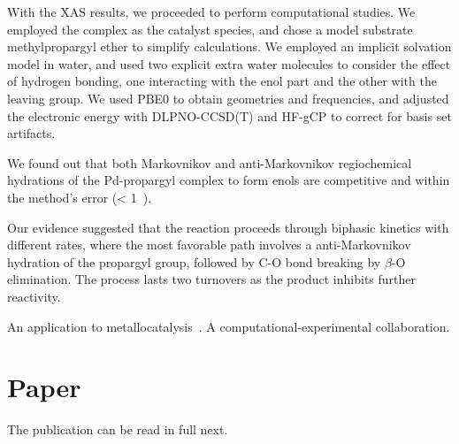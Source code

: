 With the XAS results, we proceeded to perform computational studies.
We employed the  complex as the catalyst species, and chose a
model substrate methylpropargyl ether to simplify calculations.
We employed an implicit solvation model in water, and used two explicit extra
water molecules to consider the effect of hydrogen bonding, one interacting
with the enol part and the other with the leaving group.
We used PBE0 to obtain geometries and frequencies, and adjusted the electronic
energy with DLPNO-CCSD(T) and HF-gCP to correct for basis set artifacts.

We found out that both Markovnikov and anti-Markovnikov regiochemical
hydrations of the Pd-propargyl complex to form enols are competitive and within
the method's error (< 1~\kcalmol).

Our evidence suggested that the reaction proceeds through biphasic kinetics
with different rates, where the most favorable path involves a 
anti-Markovnikov hydration of the propargyl group, followed by C-O bond breaking
by $\beta$-O elimination.
The process lasts two turnovers as the product inhibits further
reactivity.

An application to metallocatalysis~\cite{Coelho2019}.
A computational-experimental collaboration.




\section{Paper}

The publication can be read in full next.


